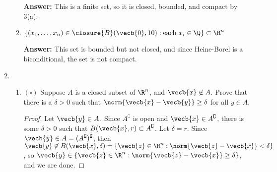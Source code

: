 \documentclass[letterpaper]{article}
\begin{document}
\begin{enumerate}
\begin{enumerate}[label=(\alph*)]
	\textbf{Answer:} This is a finite set, so it is closed, bounded, and compact by 3(a).
	
	\item $\{(x_1, \ldots, x_n)\in\closure{B}(\vecb{0},10): \text{each }x_i\in \Q\}\subset \R^n$
	
	\textbf{Answer:} This set is bounded but not closed, and since Heine-Borel is a biconditional, the set is not compact. 
	\end{enumerate}
\item 
	\begin{enumerate}[label=(\alph*)]
	\item $(\square)$ Suppose $A$ is a closed subset of $\R^n$, and $\vecb{x}\not\in A$. Prove that there is a $\delta>0$ such that $\norm{\vecb{x}-\vecb{y}}\geq\delta$ for all $y\in A$. 
	
	\begin{proof}\mbox{}
	Let $\vecb{y}\in A$. Since $A^\complement$ is open and $\vecb{x}\in A^\complement$, there is some $\delta>0$ such that $B(\vecb{x},r)\subset A^\complement$. 
	Let $\delta=r$. Since $\vecb{y}\in A=(A^\complement)^\complement$, then $\vecb{y}\not\in B(\vecb{x},\delta)=\{\vecb{z}\in\R^n:\norm{\vecb{z}-\vecb{x}}<\delta\}$, so $\vecb{y}\in\{\vecb{z}\in\R^n:\norm{\vecb{z}-\vecb{x}}\geq\delta\}$, and we are done. 
	\end{proof}
	

\end{enumerate}
\end{enumerate}
\end{document}
